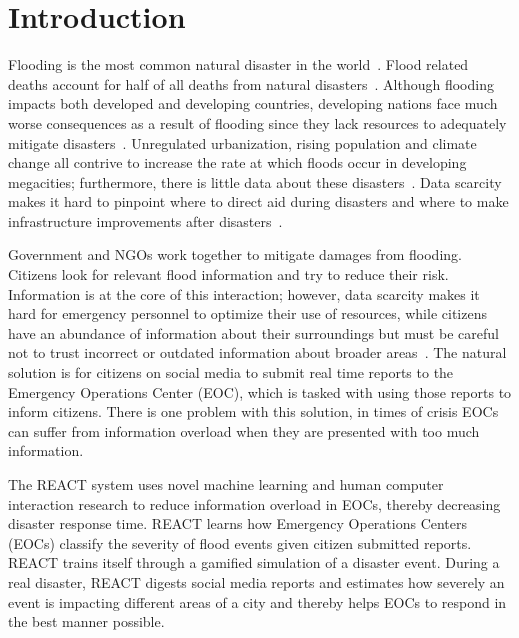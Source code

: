 \chapter{Introduction} Flooding is the most common natural disaster in the
world~\cite{chanFloodRiskAsia2012}.  Flood related deaths account for half of
all deaths from natural disasters~\cite{ohlFloodingHumanHealth2000}. 
Although flooding impacts both developed and
developing countries, developing nations face much worse consequences as a
result of flooding since they lack resources to adequately mitigate
disasters~\cite{quarantelliUrbanVulnerabilityDisasters2003}.
Unregulated urbanization, rising population and climate change all contrive to
increase the rate at which floods occur in developing megacities; furthermore,
there is little data about these disasters~\cite{chanResilientFloodRisk2018}.
Data scarcity makes it hard to
pinpoint where to direct aid during disasters and where to make infrastructure
improvements after disasters~\cite{ranaMultidimensionalModelVulnerability2018}.

Government and NGOs work together to mitigate damages from flooding.  Citizens
look for relevant flood information and try to reduce their risk.  Information
is at the core of this interaction; however, data scarcity makes it hard for
emergency personnel to optimize their use of resources, while citizens have an
abundance of information about their surroundings but must be careful not to
trust incorrect or outdated information about broader
areas~\cite{quarantelliProblematicalAspectsInformation1997}.  The natural
solution is for citizens on social media to submit real time reports to the
Emergency Operations Center (EOC), which is tasked with using those reports to inform
citizens.  There is one problem with this solution, in times of crisis EOCs can
suffer from information overload when they are presented with too much
information.

The REACT system uses novel machine learning and human computer interaction
research to reduce information overload in EOCs, thereby decreasing disaster
response time. REACT learns how Emergency Operations Centers (EOCs) classify the
severity of flood events given citizen submitted reports. REACT trains itself
through a gamified simulation of a disaster event. During a real disaster, REACT
digests social media reports and estimates how severely an event is impacting
different areas of a city and thereby helps EOCs to respond in the best manner
possible.

